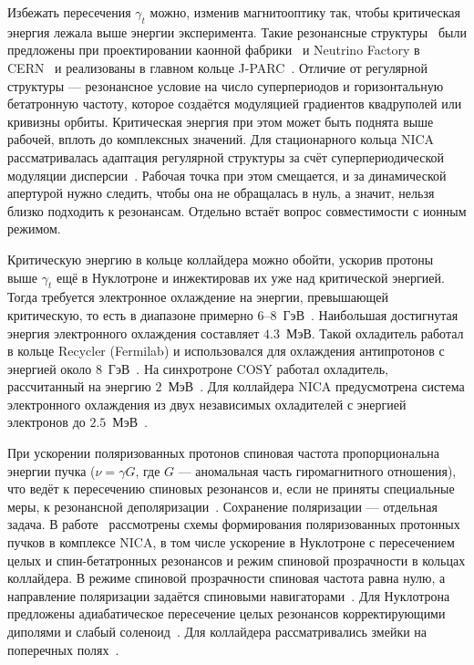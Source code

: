Избежать пересечения $\gamma_t$ можно, изменив магнитооптику так, чтобы критическая энергия лежала выше энергии эксперимента. Такие резонансные структуры~\cite{Senichev:2007_resonant,Senichev:2007_construction} были предложены при проектировании каонной фабрики~\cite{Golubeva:kaon_lattice} и Neutrino Factory в CERN~\cite{Schonauer:2000_neutrino} и реализованы в главном кольце J-PARC~\cite{Hirata:1996_bdnl,Koseki:2007_jparc}. Отличие от регулярной структуры --- резонансное условие на число суперпериодов и горизонтальную бетатронную частоту, которое создаётся модуляцией градиентов квадруполей или кривизны орбиты. Критическая энергия при этом может быть поднята выше рабочей, вплоть до комплексных значений. Для стационарного кольца NICA рассматривалась адаптация регулярной структуры за счёт суперпериодической модуляции дисперсии~\cite{Kolokolchikov:2021_high_gt,Kolokolchikov:2023_crossing_raising,Kolokolchikov:2025_dual}. Рабочая точка при этом смещается, и за динамической апертурой нужно следить, чтобы она не обращалась в нуль, а значит, нельзя близко подходить к резонансам. Отдельно встаёт вопрос совместимости с ионным режимом.

Критическую энергию в кольце коллайдера можно обойти, ускорив протоны выше $\gamma_t$ ещё в Нуклотроне и инжектировав их уже над критической энергией. Тогда требуется электронное охлаждение на энергии, превышающей критическую, то есть в диапазоне примерно $6$--$8$~ГэВ~\cite{Syresin:2021_polarized,Kolokolchikov:2026_proton_limits}. Наибольшая достигнутая энергия электронного охлаждения составляет $4.3$~МэВ. Такой охладитель работал в кольце Recycler (Fermilab) и использовался для охлаждения антипротонов с энергией около $8$~ГэВ~\cite{Nagaitsev:2006_recycler,Lebedev:2024_hec}. На синхротроне COSY работал охладитель, рассчитанный на энергию $2$~МэВ~\cite{Reva:2014_cosy}. Для коллайдера NICA предусмотрена система электронного охлаждения из двух независимых охладителей с энергией электронов до $2.5$~МэВ~\cite{Reva:2025_nica_ecs,Bryzgunov:2025_iet}.

При ускорении поляризованных протонов спиновая частота пропорциональна энергии пучка ($\nu=\gamma G$, где $G$ --- аномальная часть гиромагнитного отношения), что ведёт к пересечению спиновых резонансов и, если не приняты специальные меры, к резонансной деполяризации~\cite{Filatov:2024_nuclotron_pol}. Сохранение поляризации --- отдельная задача. В работе~\cite{Syresin:2021_polarized} рассмотрены схемы формирования поляризованных протонных пучков в комплексе NICA, в том числе ускорение в Нуклотроне с пересечением целых и спин-бетатронных резонансов и режим спиновой прозрачности в кольцах коллайдера. В режиме спиновой прозрачности спиновая частота равна нулю, а направление поляризации задаётся спиновыми навигаторами~\cite{Filatov:2026_st_mode}. Для Нуклотрона предложены адиабатическое пересечение целых резонансов корректирующими диполями и слабый соленоид~\cite{Filatov:2024_nuclotron_pol}. Для коллайдера рассматривались змейки на поперечных полях~\cite{Tsyplakov:2026_snakes}.

